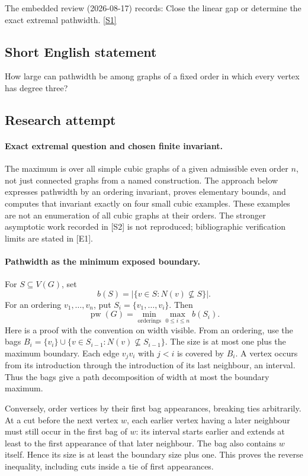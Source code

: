 \documentclass[11pt,a4paper]{article}
\newcommand{\sref}[2]{\hyperlink{source:#1:#2}{[S#2]}}
\begin{document}
The embedded review (2026-08-17) records: Close the linear gap or determine the exact extremal pathwidth. \sref{statement}{1}

\subsection{Short English statement}

How large can pathwidth be among graphs of a fixed order in which every vertex has degree three?

\subsection{Research attempt}

\paragraph{Exact extremal question and chosen finite invariant.}
The maximum is over all simple cubic graphs of a given admissible even
order $n$, not just connected graphs from a named construction. The
approach below expresses pathwidth by an ordering invariant, proves
elementary bounds, and computes that invariant exactly on four small
cubic examples. These examples are not an enumeration of all cubic
graphs at their orders. The stronger asymptotic work recorded in [S2]
is not reproduced; bibliographic verification limits are stated in [E1].

\paragraph{Pathwidth as the minimum exposed boundary.}
For $S\subseteq V(G)$, set
\[
              b(S)=|\{v\in S:N(v)\not\subseteq S\}|.
\]
For an ordering $v_1,\ldots,v_n$, put $S_i=\{v_1,\ldots,v_i\}$.
Then
\[
          \operatorname{pw}(G)=\min_{\text{orderings}}\max_{0\le i\le n}b(S_i).
\]
Here is a proof with the convention on width visible. From an ordering,
use the bags
$B_i=\{v_i\}\cup\{v\in S_{i-1}:N(v)\not\subseteq S_{i-1}\}$.
The size is at most one plus the maximum boundary. Each edge $v_jv_i$
with $j<i$ is covered by $B_i$. A vertex occurs from its introduction
through the introduction of its last neighbour, an interval. Thus the
bags give a path decomposition of width at most the boundary maximum.

Conversely, order vertices by their first bag appearances, breaking
ties arbitrarily. At a cut before the next vertex $w$, each earlier
vertex having a later neighbour must still occur in the first bag of
$w$: its interval starts earlier and extends at least to the first
appearance of that later neighbour. The bag also contains $w$ itself.
Hence its size is at least the boundary size plus one. This proves
the reverse inequality, including cuts inside a tie of first appearances.
\end{document}

